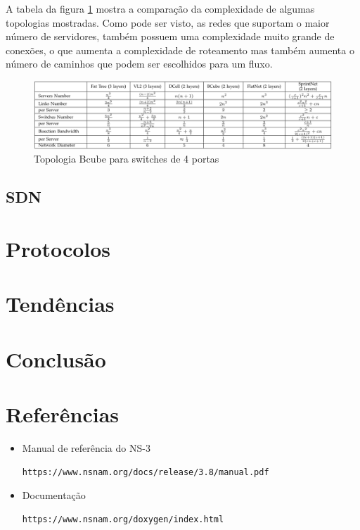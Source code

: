 \documentclass[12pt,a4paper]{report}
\begin{document}
A tabela da figura \ref{comparacao} mostra a comparação da complexidade de algumas topologias mostradas. Como pode ser visto, as redes que suportam o maior número de servidores, também possuem uma complexidade muito grande de conexões, o que aumenta a complexidade de roteamento mas também aumenta o número de caminhos que podem ser escolhidos para um fluxo.\\

\begin{figure}[H]
\includegraphics[width=1.1\textwidth]{imagens/tabela.png}
\caption{Topologia Bcube para switches de 4 portas}
\label{comparacao}
\end{figure}

\section{SDN}

\chapter{Protocolos}

\chapter{Tendências}

\chapter{Conclusão}

\chapter{Referências}

\begin{itemize}
\item Manual de referência do NS-3 \begin{verbatim}https://www.nsnam.org/docs/release/3.8/manual.pdf\end{verbatim}
\item Documentação \begin{verbatim}https://www.nsnam.org/doxygen/index.html\end{verbatim}
\end{itemize}
\end{document}
